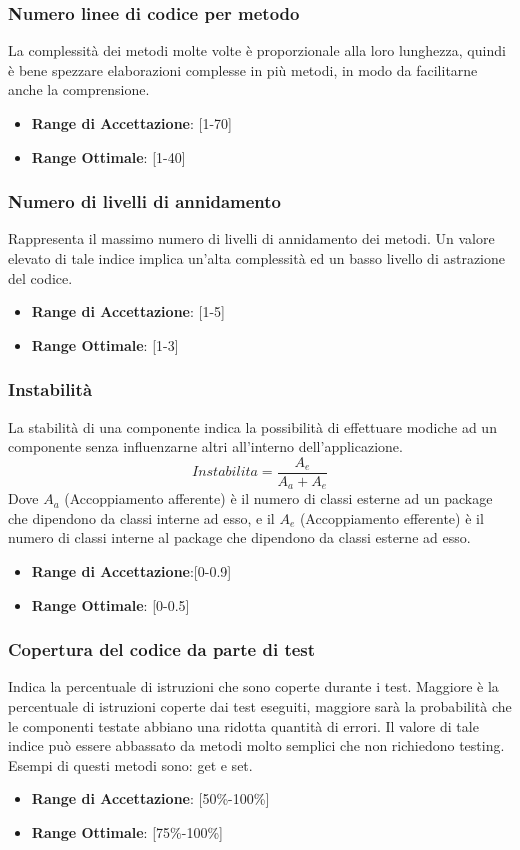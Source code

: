 \documentclass[12pt,a4paper]{article}
\begin{document}
\subsubsection{Numero linee di codice per metodo}
La complessità dei metodi molte volte è proporzionale alla loro lunghezza,
quindi è bene spezzare elaborazioni complesse in più metodi, in modo da facilitarne anche la comprensione.
\begin{itemize}
\item \textbf{Range di Accettazione}: [1-70]
\item \textbf{Range Ottimale}: [1-40]
\end{itemize}
\subsubsection{Numero di livelli di annidamento}
Rappresenta il massimo numero di livelli di annidamento dei metodi. Un valore elevato di tale indice implica un'alta complessità ed un basso livello di astrazione del codice.
\begin{itemize}
\item \textbf{Range di Accettazione}: [1-5]
\item \textbf{Range Ottimale}: [1-3]
\end{itemize}
\subsubsection{Instabilità}
La stabilità di una componente indica la possibilità di effettuare modiche ad un componente senza influenzarne altri all'interno dell'applicazione.
\[Instabilita=\frac{A_e}{A_a+A_e}\]
Dove $A_a$ (Accoppiamento afferente) è il numero di classi esterne ad un package che dipendono da classi interne ad esso, e il $A_e$ (Accoppiamento efferente) è il numero di classi interne al package che dipendono da classi esterne ad esso.
\begin{itemize}
\item \textbf{Range di Accettazione}:[0-0.9]
\item \textbf{Range Ottimale}: [0-0.5]
\end{itemize}
\subsubsection{Copertura del codice da parte di test}
Indica la percentuale di istruzioni che sono coperte durante i test. Maggiore è la percentuale di istruzioni coperte dai test eseguiti, maggiore sarà la probabilità che le componenti testate abbiano una ridotta quantità di errori. Il valore di tale indice può essere abbassato da metodi molto semplici che non richiedono testing. Esempi di questi metodi sono: get e set.
\begin{itemize}
\item \textbf{Range di Accettazione}: [50\%-100\%]
\item \textbf{Range Ottimale}: [75\%-100\%]
\end{itemize}
\end{document}
